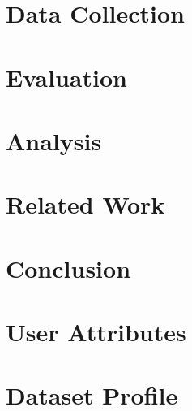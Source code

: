 \documentclass[10pt,twocolumn]{IEEEtran11}
\begin{document}
\section{Data Collection}


\section{Evaluation}


\section{Analysis}


\section{Related Work}  


\section{Conclusion}


\onecolumn
\section{User Attributes}


\section{Dataset Profile}


\twocolumn

\end{document}
